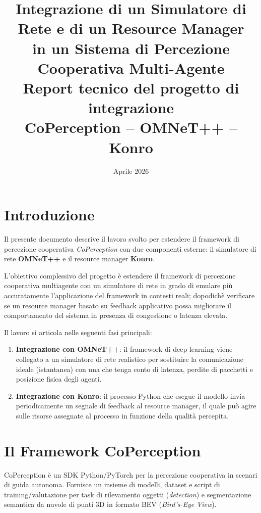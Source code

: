 \documentclass[12pt,a4paper]{article}
\title{
  \vspace{-1cm}
  \Large\textbf{Integrazione di un Simulatore di Rete e di un Resource Manager}\\
  \large\textbf{in un Sistema di Percezione Cooperativa Multi-Agente}\\[0.5em]
  \normalsize Report tecnico del progetto di integrazione\\
  CoPerception -- OMNeT++ -- Konro
}
\author{}
\date{Aprile 2026}
\begin{document}
\maketitle
\tableofcontents
\newpage

\section{Introduzione}

Il presente documento descrive il lavoro svolto per estendere il framework di percezione cooperativa
\textit{CoPerception} con due componenti esterne: il simulatore di rete \textbf{OMNeT++} e il resource
manager \textbf{Konro}.

L'obiettivo complessivo del progetto è estendere il framework di percezione cooperativa multiagente con un simulatore di rete in grado di emulare più accuratamente l'applicazione del framework in contesti reali; dopodichè verificare se un resource manager basato su feedback applicativo possa migliorare il comportamento del sistema
in presenza di congestione o latenza elevata.

Il lavoro si articola nelle seguenti fasi principali:

\begin{enumerate}
  \item \textbf{Integrazione con OMNeT++}: il framework di deep learning viene collegato a un simulatore
        di rete realistico per sostituire la comunicazione ideale (istantanea) con una che tenga conto
        di latenza, perdite di pacchetti e posizione fisica degli agenti.

  \item \textbf{Integrazione con Konro}: il processo Python che esegue il modello invia periodicamente
        un segnale di feedback al resource manager, il quale pu\`o agire sulle risorse assegnate al
        processo in funzione della qualit\`a percepita.
\end{enumerate}

\section{Il Framework CoPerception}

CoPerception \`e un SDK Python/PyTorch per la percezione cooperativa in scenari di guida autonoma.
Fornisce un insieme di modelli, dataset e script di training/valutazione per task di rilevamento
oggetti (\textit{detection}) e segmentazione semantica da nuvole di punti 3D in formato BEV
(\textit{Bird's-Eye View}).
\end{document}
